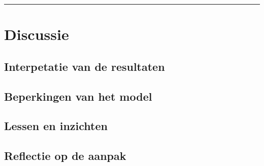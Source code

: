 \vspace{0.2cm}
{\color{gray}\hrule}
\section{Discussie}





\subsection{Interpetatie van de resultaten}

\subsection{Beperkingen van het model}

\subsection{Lessen en inzichten}

\subsection{Reflectie op de aanpak}


